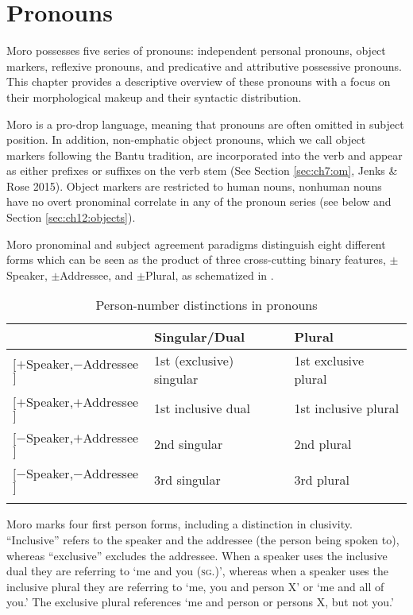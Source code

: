 \chapter{Pronouns}\label{chap:7:pronouns}

Moro possesses five series of pronouns: independent personal pronouns, object markers, reflexive pronouns, and predicative and attributive possessive pronouns.  This chapter provides a descriptive overview of these pronouns with a focus on their morphological makeup and their syntactic distribution. %

Moro is a pro-drop language, meaning that pronouns are often omitted in subject position. In addition, non-emphatic object pronouns, which we call object markers following the Bantu tradition, are incorporated into the verb and appear as either prefixes or suffixes on the verb stem (See Section \ref{sec:ch7:om}, Jenks \& Rose 2015). Object markers are restricted to human nouns, nonhuman nouns have no overt pronominal correlate in any of the pronoun series (see below and Section \ref{sec:ch12:objects}).

Moro pronominal and subject agreement paradigms distinguish eight different forms which can be seen as the product of three cross-cutting binary features, $\pm$Speaker, $\pm$Addressee, and $\pm$Plural, as schematized in .

\begin{table}
	\begin{tabular}[t]{lll}
\lsptoprule
& Singular/Dual & Plural \\
\midrule
$[+${Speaker},$-${Addressee}$]$ & 1st (exclusive) singular & 1st exclusive plural \\
$[+${Speaker},$+${Addressee}$]$ &1st inclusive dual & 1st inclusive plural\\
$[-${Speaker},$+${Addressee}$]$ & 2nd singular & 2nd plural \\
$[-${Speaker},$-${Addressee}$]$ & 3rd singular & 3rd plural\\
\lspbottomrule	
\end{tabular}
  \caption{Person-number distinctions in pronouns}
  \label{tab:ch7:2}
\end{table}

Moro marks four first person forms, including a distinction in clusivity. “Inclusive” refers to the speaker and the addressee (the person being spoken to), whereas “exclusive” excludes the addressee. When a speaker uses the inclusive dual they are referring to ‘me and you (\textsc{sg}.)’, whereas when a speaker uses the inclusive plural they are referring to ‘me, you and person X’ or `me and all of you.' The exclusive plural references ‘me and person or persons X, but not you.’ 

